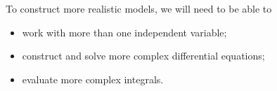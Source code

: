 To construct more realistic models, we will need to be able to
  \begin{itemize}[topsep=0pt]
    \item work with more than one independent variable;
    \item construct and solve more complex differential equations;
    \item evaluate more complex integrals.
  \end{itemize}


